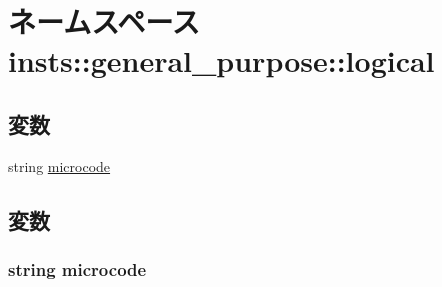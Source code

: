 \hypertarget{namespaceinsts_1_1general__purpose_1_1logical}{
\section{ネームスペース insts::general\_\-purpose::logical}
\label{namespaceinsts_1_1general__purpose_1_1logical}
}
\subsection*{変数}
\begin{DoxyCompactItemize}
\item 
string \hyperlink{namespaceinsts_1_1general__purpose_1_1logical_a770f11a173e99389a8802f0107ed8f52}{microcode}
\end{DoxyCompactItemize}


\subsection{変数}
\hypertarget{namespaceinsts_1_1general__purpose_1_1logical_a770f11a173e99389a8802f0107ed8f52}{
\subsubsection[{microcode}]{\setlength{\rightskip}{0pt plus 5cm}string {\bf microcode}}}
\label{namespaceinsts_1_1general__purpose_1_1logical_a770f11a173e99389a8802f0107ed8f52}
